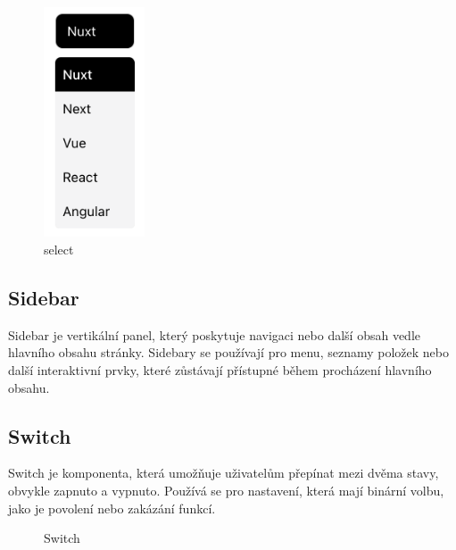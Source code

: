 \begin{figure}[H]
  \centering
  \includegraphics[width=3cm]{images/select}
  \captionsetup{justification=centering,margin=2cm}
  \caption{select} \label{picture:select}
\end{figure}

\subsection{Sidebar}
Sidebar je vertikální panel, který poskytuje navigaci nebo další obsah vedle hlavního obsahu stránky. Sidebary se používají pro menu, seznamy položek nebo další interaktivní prvky, které zůstávají přístupné během procházení hlavního obsahu.

\subsection{Switch}
Switch je komponenta, která umožňuje uživatelům přepínat mezi dvěma stavy, obvykle zapnuto a vypnuto. Používá se pro nastavení, která mají binární volbu, jako je povolení nebo zakázání funkcí.

\begin{figure}[H]
  \centering
  \hspace{1cm}
  \captionsetup{justification=centering,margin=2cm}
  \caption{Switch}
\end{figure}

